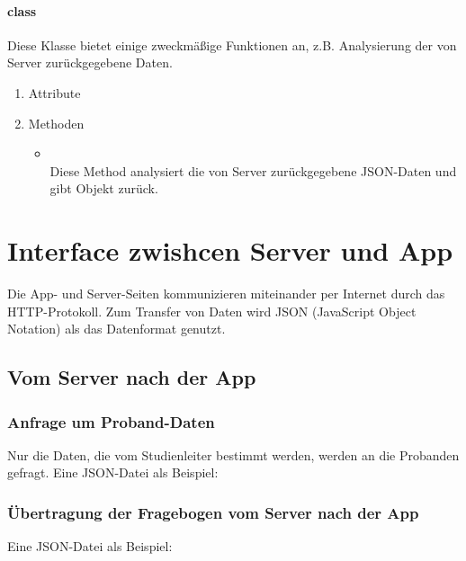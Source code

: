 \documentclass[a4paper]{scrreprt}
\begin{document}
{                \subsubsection{class }

                    Diese Klasse bietet einige zweckmäßige Funktionen an, z.B. Analysierung der  von Server zurückgegebene Daten.

                    \begin{enumerate}
                        \item Attribute
                        \item Methoden
                            \begin{itemize}
                                \item {\large {}}\\
                                Diese Method analysiert die von Server zurückgegebene JSON-Daten und gibt  Objekt zurück.
                            \end{itemize}
                    \end{enumerate}


    \chapter{Interface zwishcen Server und App}
        Die App- und Server-Seiten kommunizieren miteinander per Internet durch das HTTP-Protokoll. Zum Transfer von Daten wird JSON (JavaScript Object Notation) als das Datenformat genutzt.

        \section{Vom Server nach der App}
            \subsection{Anfrage um Proband-Daten}
                Nur die Daten, die vom Studienleiter bestimmt werden, werden an die Probanden gefragt. Eine JSON-Datei als Beispiel:
                
                

            \subsection{Übertragung der Fragebogen vom Server nach der App}
                Eine JSON-Datei als Beispiel:
                
}
\end{document}
